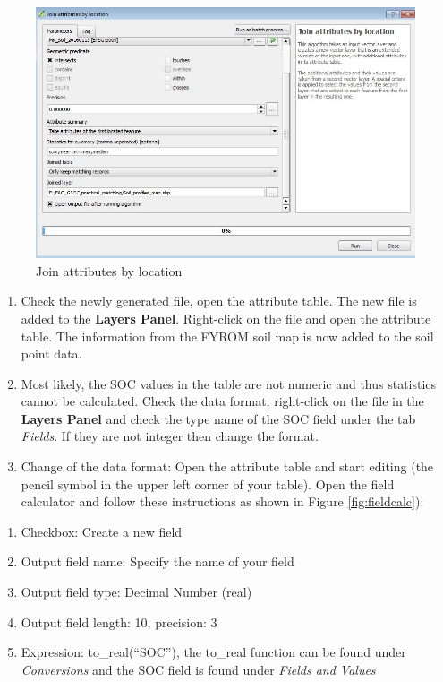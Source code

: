 \documentclass[10pt,b5paper,]{book}
\providecommand{\tightlist}{%
  \setlength{\itemsep}{0pt}\setlength{\parskip}{0pt}}
\theoremstyle{definition}
\theoremstyle{definition}
\theoremstyle{definition}
\theoremstyle{remark}
\begin{document}
\begin{figure}

{\centering \includegraphics[width=0.8\linewidth]{images/Conv_upscaling4} 

}

\caption{Join attributes by location}\label{fig:joinloc}
\end{figure}

\begin{enumerate}
\def\labelenumi{\arabic{enumi}.}
\setcounter{enumi}{1}
\tightlist
\item
  Check the newly generated file, open the attribute table. The new file
  is added to the \textbf{Layers Panel}. Right-click on the file and
  open the attribute table. The information from the FYROM soil map is
  now added to the soil point data.
\item
  Most likely, the SOC values in the table are not numeric and thus
  statistics cannot be calculated. Check the data format, right-click on
  the file in the \textbf{Layers Panel} and check the type name of the
  SOC field under the tab \emph{Fields}. If they are not integer then
  change the format.
\item
  Change of the data format: Open the attribute table and start editing
  (the pencil symbol in the upper left corner of your table). Open the
  field calculator and follow these instructions as shown in Figure
  \ref{fig:fieldcalc}):
\end{enumerate}

\begin{enumerate}
\def\labelenumi{\alph{enumi}.}
\tightlist
\item
  Checkbox: Create a new field
\item
  Output field name: Specify the name of your field
\item
  Output field type: Decimal Number (real)
\item
  Output field length: 10, precision: 3
\item
  Expression: to\_real(``SOC''), the to\_real function can be found
  under \emph{Conversions} and the SOC field is found under \emph{Fields
  and Values}
\end{enumerate}
\end{document}
